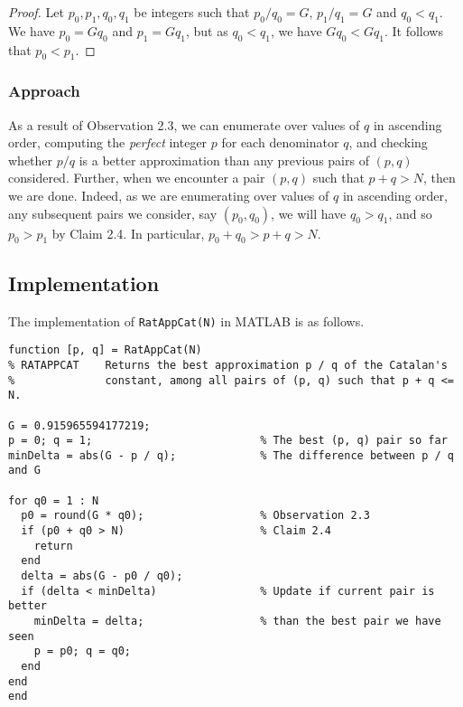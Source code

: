 \begin{proof}
	Let $p_0, p_1, q_0, q_1$ be integers such that $p_0 / q_0 = G$, $p_1 / q_1 = G$ and $q_0 < q_1$. We have $p_0 = Gq_0$ and $p_1 = Gq_1$, but as $q_0 < q_1$, we have $Gq_0 < Gq_1$. It follows that $p_0 < p_1$.
\end{proof}

\subsubsection{Approach}
As a result of Observation 2.3, we can enumerate over values of $q$ in ascending order, computing the \textit{perfect} integer $p$ for each denominator $q$, and checking whether  $p / q$ is a better approximation than any previous pairs of $(p, q)$ considered. Further, when we encounter a pair $(p, q)$ such that $p + q > N$, then we are done. Indeed, as we are enumerating over values of $q$ in ascending order, any subsequent pairs we consider, say $(p_0, q_0)$, we will have $q_0 > q_1$, and so $p_0 > p_1$ by Claim 2.4. In particular, $p_0 + q_0 > p + q > N$.

\newpage

\subsection{Implementation}
The implementation of \lstinline|RatAppCat(N)| in MATLAB is as follows.

\begin{lstlisting}
function [p, q] = RatAppCat(N)
% RATAPPCAT    Returns the best approximation p / q of the Catalan's 
%              constant, among all pairs of (p, q) such that p + q <= N.

G = 0.915965594177219;
p = 0; q = 1;                          % The best (p, q) pair so far
minDelta = abs(G - p / q);             % The difference between p / q and G

for q0 = 1 : N
  p0 = round(G * q0);                  % Observation 2.3
  if (p0 + q0 > N)                     % Claim 2.4
    return
  end
  delta = abs(G - p0 / q0);              
  if (delta < minDelta)                % Update if current pair is better
    minDelta = delta;                  % than the best pair we have seen
    p = p0; q = q0;
  end
end
end
\end{lstlisting}


